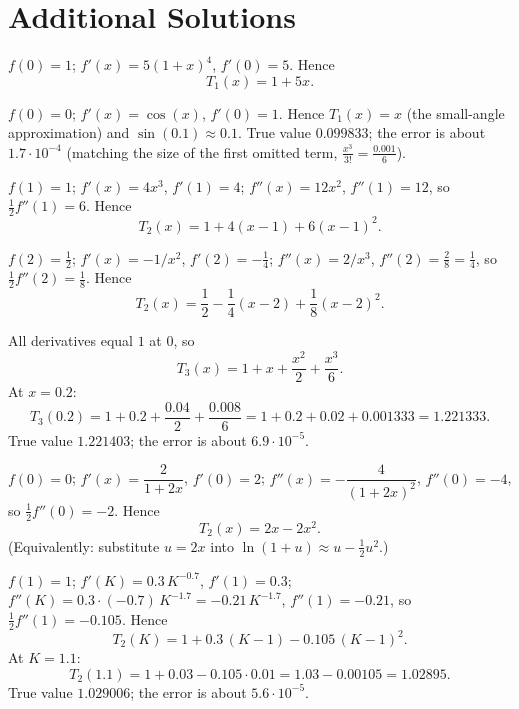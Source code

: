 \section{Additional Solutions}

\begin{solutions}
  \item $f(0)=1$; $f'(x)=5(1+x)^{4}$, $f'(0)=5$. Hence
        \[
          T_{1}(x)=1+5x .
        \]

  \item $f(0)=0$; $f'(x)=\cos(x)$, $f'(0)=1$. Hence $T_{1}(x)=x$ (the
        small-angle approximation) and $\sin(0.1)\approx 0.1$. True
        value $0.099833$; the error is about $1.7\cdot 10^{-4}$
        (matching the size of the first omitted term,
        $\tfrac{x^{3}}{3!}=\tfrac{0.001}{6}$).

  \item $f(1)=1$; $f'(x)=4x^{3}$, $f'(1)=4$; $f''(x)=12x^{2}$,
        $f''(1)=12$, so $\tfrac12 f''(1)=6$. Hence
        \[
          T_{2}(x)=1+4(x-1)+6(x-1)^{2} .
        \]

  \item $f(2)=\tfrac12$; $f'(x)=-1/x^{2}$, $f'(2)=-\tfrac14$;
        $f''(x)=2/x^{3}$, $f''(2)=\tfrac28=\tfrac14$, so
        $\tfrac12 f''(2)=\tfrac18$. Hence
        \[
          T_{2}(x)=\frac12-\frac14(x-2)+\frac18(x-2)^{2} .
        \]

  \item All derivatives equal $1$ at $0$, so
        \[
          T_{3}(x)=1+x+\frac{x^{2}}{2}+\frac{x^{3}}{6} .
        \]
        At $x=0.2$:
        \[
          T_{3}(0.2)=1+0.2+\frac{0.04}{2}+\frac{0.008}{6}
                    =1+0.2+0.02+0.001333=1.221333 .
        \]
        True value $1.221403$; the error is about $6.9\cdot 10^{-5}$.

  \item $f(0)=0$; $f'(x)=\dfrac{2}{1+2x}$, $f'(0)=2$;
        $f''(x)=-\dfrac{4}{(1+2x)^{2}}$, $f''(0)=-4$, so
        $\tfrac12 f''(0)=-2$. Hence
        \[
          T_{2}(x)=2x-2x^{2} .
        \]
        (Equivalently: substitute $u=2x$ into
        $\ln(1+u)\approx u-\tfrac12 u^{2}$.)

  \item $f(1)=1$; $f'(K)=0.3\,K^{-0.7}$, $f'(1)=0.3$;
        $f''(K)=0.3\cdot(-0.7)\,K^{-1.7}=-0.21\,K^{-1.7}$,
        $f''(1)=-0.21$, so $\tfrac12 f''(1)=-0.105$. Hence
        \[
          T_{2}(K)=1+0.3\,(K-1)-0.105\,(K-1)^{2} .
        \]
        At $K=1.1$:
        \[
          T_{2}(1.1)=1+0.03-0.105\cdot 0.01=1.03-0.00105=1.02895 .
        \]
        True value $1.029006$; the error is about $5.6\cdot 10^{-5}$.


\end{solutions}
